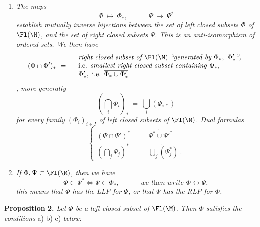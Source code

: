 \begin{enumerate}[label={}]
\item[c)] \textit{The maps}
\[
\Phi \ \longmapsto\ \Phi_*, \qquad\quad \Psi\ \longmapsto\ \Psi^*
\]
\textit{establish mutually inverse bijections between the set of left closed subsets $\Phi$ of} $\Fl(\M)$\textit{, and the set of right closed subsets $\Psi$. This is an anti-isomorphism of ordered sets. We then have}
\[
(\Phi \cap \Phi')_* \ = \quad
\begin{array}{l}
\textit{right closed subset of } \Fl(\M) \ \textit{``generated by } \Phi_*,\ \Phi'_*\textit{'',} \\
\text{i.e. \textit{smallest right closed subset containing} } \Phi_*, \\
\Phi'_*, \text{ i.e. } \overline{\Phi_* \cup \Phi'_*}
\end{array}
\]
\textit{, more generally}
\[
(\bigcap_i \Phi_i)_* \ = \ \overline{\bigcup_i (\Phi_{i\,*})}
\]
\textit{for every family $(\Phi_i)_{i \in I}$ of left closed subsets of} $\Fl(\M)$\textit{. Dual formulas} 
\[
\left\{
\begin{aligned}
(\Psi \cap \Psi')^* \ &= \ \widetilde{\Psi^* \cup \Psi'^*} \\
(\bigcap_j \Psi_j)^* \ &= \ \widetilde{\bigcup_j (\Psi_j^*)}\ .
\end{aligned}
\right.
\]

\item[d)] \textit{If} $\Phi, \Psi \subset \Fl(\M)$\textit{, then we have}
\[
\Phi \subset \Psi^* \iff \Psi \subset \Phi_*, \qquad\quad \textit{we then write } \Phi \longleftrightarrow \Psi,
\]
\textit{this means that $\Phi$ has the LLP for $\Psi$, or that $\Psi$ has the RLP for $\Phi$.}
\end{enumerate}



\noindent\textbf{Proposition 2.} \textit{Let $\Phi$ be a left closed subset of} $\Fl(\M)$\textit{. Then $\Phi$ satisfies the conditions} a) b) c) \textit{below:}

